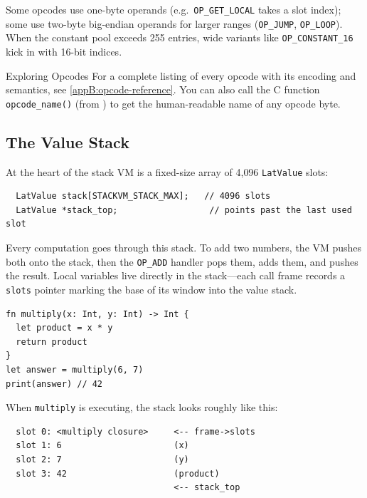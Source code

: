 Some opcodes use one-byte operands (e.g.\ \lstinline|OP_GET_LOCAL| takes a slot
index); some use two-byte big-endian operands for larger ranges
(\lstinline|OP_JUMP|, \lstinline|OP_LOOP|). When the constant pool exceeds 255
entries, wide variants like \lstinline|OP_CONSTANT_16| kick in with 16-bit
indices.

\begin{tipbox}{Exploring Opcodes}
For a complete listing of every opcode with its encoding and semantics, see
\cref{appB:opcode-reference}. You can also call the C function
\lstinline|opcode_name()| (from ) to get the
human-readable name of any opcode byte.
\end{tipbox}

\subsection{The Value Stack}\label{subsec:value-stack}

At the heart of the stack VM is a fixed-size array of 4{,}096
\lstinline|LatValue| slots:

\begin{verbatim}
  LatValue stack[STACKVM_STACK_MAX];   // 4096 slots
  LatValue *stack_top;                  // points past the last used slot
\end{verbatim}

Every computation goes through this stack. To add two numbers, the VM pushes
both onto the stack, then the \lstinline|OP_ADD| handler pops them, adds them,
and pushes the result. Local variables live directly in the stack---each call
frame records a \lstinline|slots| pointer marking the base of its window into
the value stack.

\begin{lstlisting}[language=Lattice, caption={Visualising the value stack}]
fn multiply(x: Int, y: Int) -> Int {
  let product = x * y
  return product
}
let answer = multiply(6, 7)
print(answer) // 42
\end{lstlisting}

When \lstinline|multiply| is executing, the stack looks roughly like this:

\begin{verbatim}
  slot 0: <multiply closure>     <-- frame->slots
  slot 1: 6                      (x)
  slot 2: 7                      (y)
  slot 3: 42                     (product)
                                 <-- stack_top
\end{verbatim}

